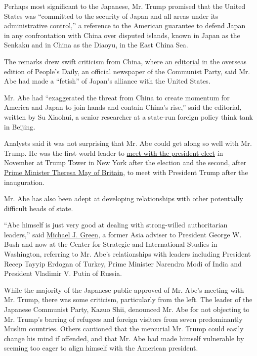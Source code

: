 Perhaps most significant to the Japanese, Mr. Trump promised that the
United States was ``committed to the security of Japan and all areas
under its administrative control,'' a reference to the American
guarantee to defend Japan in any confrontation with China over disputed
islands, known in Japan as the Senkaku and in China as the Diaoyu, in
the East China Sea.

The remarks drew swift criticism from China, where an
\href{http://paper.people.com.cn/rmrbhwb/html/2017-02/13/content_1749422.htm}{editorial}
in the overseas edition of People's Daily, an official newspaper of the
Communist Party, said Mr. Abe had made a ``fetish'' of Japan's alliance
with the United States.

Mr. Abe had ``exaggerated the threat from China to create momentum for
America and Japan to join hands and contain China's rise,'' said the
editorial, written by Su Xiaohui, a senior researcher at a state-run
foreign policy think tank in Beijing.

Analysts said it was not surprising that Mr. Abe could get along so well
with Mr. Trump. He was the first world leader to
\href{https://www.nytimes.com/2016/11/17/world/asia/shinzo-abe-donald-trump.html}{meet
with the president-elect} in November at Trump Tower in New York after
the election and the second, after
\href{https://www.nytimes.com/2017/01/27/world/europe/theresa-may-britain-trump.html}{Prime
Minister Theresa May of Britain}, to meet with President Trump after the
inauguration.

Mr. Abe has also been adept at developing relationships with other
potentially difficult heads of state.

``Abe himself is just very good at dealing with strong-willed
authoritarian leaders,'' said
\href{https://www.csis.org/people/michael-j-green}{Michael J. Green}, a
former Asia adviser to President George W. Bush and now at the Center
for Strategic and International Studies in Washington, referring to Mr.
Abe's relationships with leaders including President Recep Tayyip
Erdogan of Turkey, Prime Minister Narendra Modi of India and President
Vladimir V. Putin of Russia.

While the majority of the Japanese public approved of Mr. Abe's meeting
with Mr. Trump, there was some criticism, particularly from the left.
The leader of the Japanese Communist Party, Kazuo Shii, denounced Mr.
Abe for not objecting to Mr. Trump's barring of refugees and foreign
visitors from seven predominantly Muslim countries. Others cautioned
that the mercurial Mr. Trump could easily change his mind if offended,
and that Mr. Abe had made himself vulnerable by seeming too eager to
align himself with the American president.


